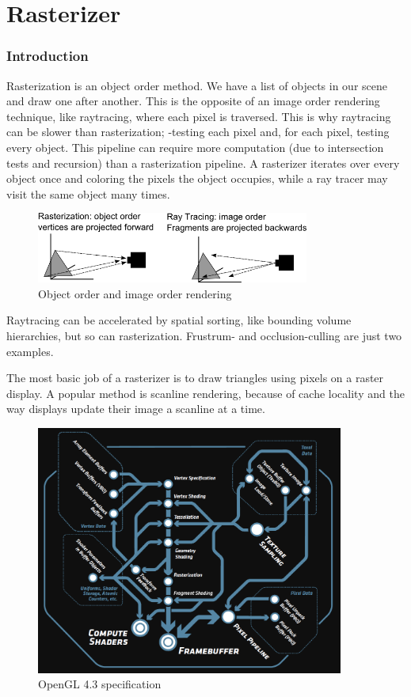 \part{Rasterizer}


\section{Introduction}
Rasterization is an object order method. We have a list of objects in our scene and draw one after another. This is the opposite of an image order rendering technique, like raytracing, where each pixel is traversed. This is why raytracing can be slower than rasterization; -testing each pixel and, for each pixel, testing every object. This pipeline can require more computation (due to intersection tests and recursion) than a rasterization pipeline. A rasterizer iterates over every object once and coloring the pixels the object occupies, while a ray tracer may visit the same object many times.

	\begin{figure}[ht]
		\centering
		\includegraphics[width=0.80\textwidth]{Media/rasterizer_image_vs_object_order.png}
		\caption{Object order and image order rendering}
		\label{fig:object_vs_image}
	\end{figure}

Raytracing can be accelerated by spatial sorting, like bounding volume hierarchies, but so can rasterization. Frustrum- and occlusion-culling are just two examples.

The most basic job of a rasterizer is to draw triangles using pixels on a raster display. A popular method is scanline rendering, because of cache locality and the way displays update their image a scanline at a time.

\begin{figure}[H]
  \centering
  \includegraphics[width=0.90\textwidth]{Media/opengl43.png}
  \caption{OpenGL 4.3 specification}   
  \label{fig:OpenGL43Spec}
\end{figure}

